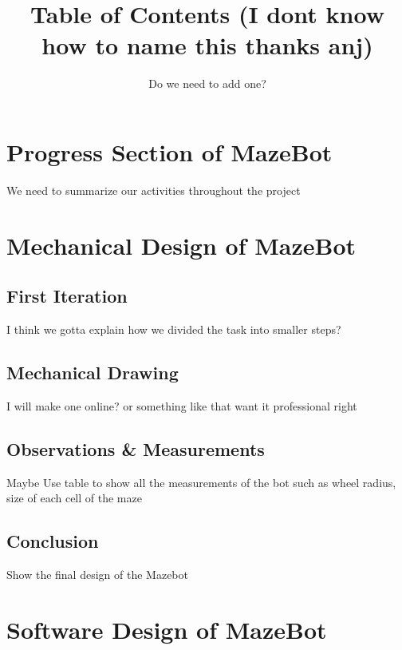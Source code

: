 \documentclass[11pt]{article}
\date{}
\title{Table of Contents (I dont know how to name this thanks anj)}
\author{Do we need to add one?}
\begin{document}
\maketitle

\tableofcontents

\newpage


\section{Progress Section of MazeBot}

We need to summarize our activities throughout the project

\newpage

\section{Mechanical Design of MazeBot}

\subsection{First Iteration}

I think we gotta explain how we divided the task into smaller steps?

\subsection{Mechanical Drawing}

I will make one online? or something like that want it professional right

\subsection{Observations \& Measurements}

Maybe Use table to show all the measurements of the bot such as wheel radius, size of each cell of the maze

\subsection{Conclusion}

Show the final design of the Mazebot

\newpage

\section{Software Design of MazeBot}
\end{document}
